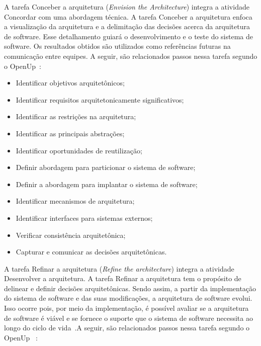 %


A tarefa Conceber a arquitetura (\emph{Envision the Architecture}) integra a atividade Concordar com uma abordagem técnica. A tarefa Conceber a arquitetura enfoca a visualização da arquitetura e a delimitação das decisões acerca da arquitetura de software. Esse detalhamento guiará o desenvolvimento e o teste do sistema de software. Os resultados obtidos são utilizados como referências futuras na comunicação entre equipes. A seguir, são relacionados passos nessa tarefa segundo o OpenUp~\cite{openup}:

\begin{itemize}
    \item Identificar objetivos arquitetônicos;
    \item Identificar requisitos arquitetonicamente significativos;
    \item Identificar as restrições na arquitetura;
    \item Identificar as principais abstrações;
    \item Identificar oportunidades de reutilização;
    \item Definir abordagem para particionar o sistema de software;
    \item Definir a abordagem para implantar o sistema de software;
    \item Identificar mecanismos de arquitetura;
    \item Identificar interfaces para sistemas externos;
    \item Verificar consistência arquitetônica;
    \item Capturar e comunicar as decisões arquitetônicas.
\end{itemize}

A tarefa Refinar a arquitetura (\emph{Refine the architecture}) integra a atividade Desenvolver a arquitetura. A tarefa Refinar a arquitetura tem o propósito de delinear e definir decisões arquitetônicas. Sendo assim, a partir da implementação do sistema de software e das suas modificações, a arquitetura de software evolui. Isso ocorre pois, por meio da implementação, é possível avaliar se a arquitetura de software é viável e se fornece o suporte que o sistema de software necessita ao longo do ciclo de vida~\cite{openup}.A seguir, são relacionados passos nessa tarefa segundo o OpenUp ~\cite{openup}:

